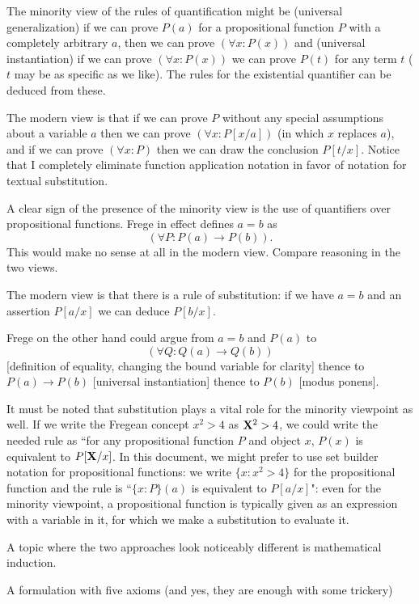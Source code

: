 \documentclass[12pt]{article}
\begin{document}
The minority view of the rules of quantification might be (universal generalization) if we can prove $P(a)$ for a propositional function $P$ with a completely arbitrary $a$, then we can prove
$(\forall x:P(x))$ and (universal instantiation) if we can prove $(\forall x:P(x))$ we can prove $P(t)$ for any term $t$ ($t$ may be as specific as we like).  The rules for the existential quantifier can be deduced from these.

The modern view is that if we can prove $P$ without any special assumptions about a variable $a$ then we can prove $(\forall x:P[x/a])$ (in which $x$ replaces $a$), and if we can prove
$(\forall x:P)$ then we can draw the conclusion $P[t/x]$.  Notice that I completely eliminate function application notation in favor of notation for textual substitution.

A clear sign of the presence of the minority view is the use of quantifiers over propositional functions.  Frege in effect defines $a=b$ as $$(\forall P:P(a) \rightarrow P(b)).$$  This would make no sense at all in the modern view.  Compare reasoning in the two views.

The modern view is that there is a rule of substitution:  if we have $a=b$ and an assertion $P[a/x]$ we can deduce $P[b/x]$.

Frege on the other hand could argue from $a=b$ and $P(a)$ to $$(\forall Q:Q(a) \rightarrow Q(b))$$ [definition of equality, changing the bound variable for clarity] thence to
$P(a) \rightarrow P(b)$ [universal instantiation] thence to $P(b)$ [modus ponens].

It must be noted that substitution plays a vital role for the minority viewpoint as well.  If we write the Fregean concept $x^2>4$ as ${\bf X}^2>4$, we could write the needed rule
as ``for any propositional function $P$ and object $x$, $P(x)$ is equivalent to $P[{\bf X}/x]$.  In this document, we might prefer to use set builder notation for propositional functions:  we write $\{x:x^2>4\}$ for the propositional function and the rule is ``$\{x:P\}(a)$ is equivalent to $P[a/x]$":  even for the minority viewpoint, a propositional function is typically given as an expression with a variable in it, for which we make a substitution to evaluate it.

A topic where the two approaches look noticeably different is mathematical induction.

A formulation with five axioms (and yes, they are enough with some trickery)
\end{document}
